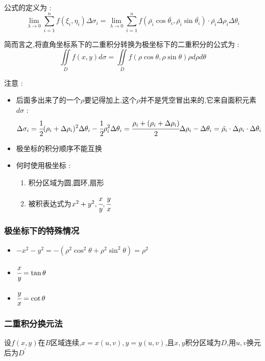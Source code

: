 \documentclass[UTF8,12pt]{ctexbook}
\newcommand{\limNormal}[1]{\lim\limits_{#1}}
\newcommand{\derivative}{^\prime}
\newcommand{\upDownSum}[2]{\sum\limits_{#2}^{#1}}
\newcommand{\defFunction}[1]{f(#1)}
\newcommand{\doubleIntegralOnZone}[1]{\iint\limits_{#1}}
\begin{document}
{{{{    公式的定义为 :
    $$
      \limNormal{\lambda \to 0}\upDownSum{n}{i = 1}\defFunction{\xi_i,\eta_i}\Delta\sigma_i = \limNormal{\lambda \to 0}\upDownSum{n}{i = 1}\defFunction{\bar{\rho_i}\cos\bar{\theta_i}, \bar{\rho_i}\sin\bar{\theta_i}}\cdot\bar{\rho_i}\Delta\rho_i\Delta\theta_i
    $$

    简而言之,将直角坐标系下的二重积分转换为极坐标下的二重积分的公式为 :
    $$
      \doubleIntegralOnZone{D}\defFunction{x,y}d\sigma = \doubleIntegralOnZone{D}\defFunction{\rho\cos\theta,\rho\sin\theta}\rho d\rho d\theta
    $$

    注意 :
    \begin{itemize}
      \item {
            后面多出来了的一个$\rho$要记得加上,这个$\rho$并不是凭空冒出来的,它来自面积元素$d\sigma$ :
            $$
              \Delta\sigma_i = \cfrac{1}{2}(\rho_i + \Delta\rho_i)^2\Delta\theta_i - \cfrac{1}{2}\rho_i^2\Delta\theta_i = \cfrac{\rho_i + (\rho_i + \Delta\rho_i)}{2}\Delta\rho_i - \Delta\theta_i = \bar{\rho_i}\cdot\Delta\rho_i\cdot\Delta\theta_i
            $$
            }
      \item {
            极坐标的积分顺序不能互换
            }
      \item{
            何时使用极坐标 :
            \begin{enumerate}
              \item 积分区域为圆,圆环,扇形
              \item 被积表达式为$x^2 + y^2,\cfrac{x}{y},\cfrac{y}{x}$
            \end{enumerate}
            }
    \end{itemize}

  }%

  \subsubsection{极坐标下的特殊情况}{
    \begin{itemize}
      \item $-x^2 -y^2 = -(\rho^2\cos^2\theta + \rho^2\sin^2\theta) = \rho^2$
      \item $\cfrac{x}{y} = \tan\theta$
      \item $\cfrac{y}{x} = \cot\theta$
    \end{itemize}
  }%

  \subsubsection{二重积分换元法}{
    设$\defFunction{x,y}$在$B$区域连续,$x = x(u,v),y = y(u,v)$,且$x,y$积分区域为$D$,用$u,v$换元后为$D\derivative$\\

}}}}
\end{document}

